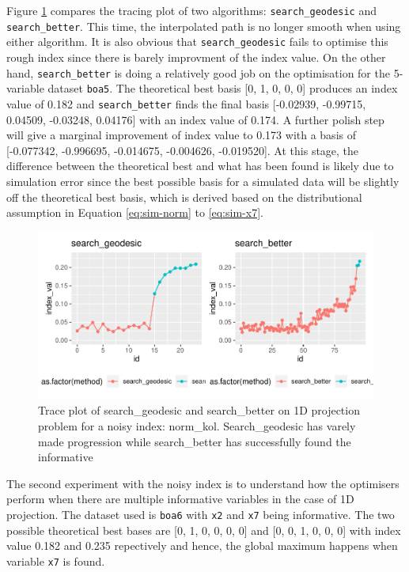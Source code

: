 \documentclass[12pt]{article}
\begin{document}
Figure \ref{kol-cdf} compares the tracing plot of two algorithms: \texttt{search\_geodesic} and \texttt{search\_better}. This time, the interpolated path is no longer smooth when using either algorithm. It is also obvious that \texttt{search\_geodesic} fails to optimise this rough index since there is barely improvment of the index value. On the other hand, \texttt{search\_better} is doing a relatively good job on the optimisation for the 5-variable dataset \texttt{boa5}. The theoretical best basis {[}0, 1, 0, 0, 0{]} produces an index value of 0.182 and \texttt{search\_better} finds the final basis {[}-0.02939, -0.99715, 0.04509, -0.03248, 0.04176{]} with an index value of 0.174. A further polish step will give a marginal improvement of index value to 0.173 with a basis of {[}-0.077342, -0.996695, -0.014675, -0.004626, -0.019520{]}. At this stage, the difference between the theoretical best and what has been found is likely due to simulation error since the best possible basis for a simulated data will be slightly off the theoretical best basis, which is derived based on the distributional assumption in Equation \ref{eq:sim-norm} to \ref{eq:sim-x7}.

\begin{figure}
\centering
\includegraphics{paper_files/figure-latex/kol-cdf-1.pdf}
\caption{\label{fig:kol-cdf}\label{kol-cdf}Trace plot of search\_geodesic and search\_better on 1D projection problem for a noisy index: norm\_kol. Search\_geodesic has varely made progression while search\_better has successfully found the informative}
\end{figure}

The second experiment with the noisy index is to understand how the optimisers perform when there are multiple informative variables in the case of 1D projection. The dataset used is \texttt{boa6} with \texttt{x2} and \texttt{x7} being informative. The two possible theoretical best bases are {[}0, 1, 0, 0, 0, 0{]} and {[}0, 0, 1, 0, 0, 0{]} with index value 0.182 and 0.235 repectively and hence, the global maximum happens when variable \texttt{x7} is found.
\end{document}
